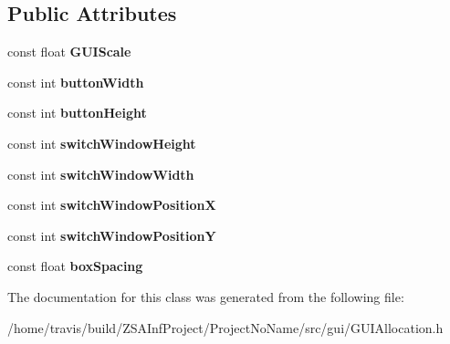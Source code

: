 \subsection*{Public Attributes}
\begin{DoxyCompactItemize}
\item 
\hypertarget{classModeSwitcherAllocation_a8b43cce074611dd34b0e8e4ed9684f5b}{const float {\bfseries G\-U\-I\-Scale}}\label{classModeSwitcherAllocation_a8b43cce074611dd34b0e8e4ed9684f5b}

\item 
\hypertarget{classModeSwitcherAllocation_a1a07c9a15d06237183a0e412f122e4a7}{const int {\bfseries button\-Width}}\label{classModeSwitcherAllocation_a1a07c9a15d06237183a0e412f122e4a7}

\item 
\hypertarget{classModeSwitcherAllocation_a8e44e9460d5877b49d0e63939caf9232}{const int {\bfseries button\-Height}}\label{classModeSwitcherAllocation_a8e44e9460d5877b49d0e63939caf9232}

\item 
\hypertarget{classModeSwitcherAllocation_a170e620e2f3a4ff56d53e65c64cf1444}{const int {\bfseries switch\-Window\-Height}}\label{classModeSwitcherAllocation_a170e620e2f3a4ff56d53e65c64cf1444}

\item 
\hypertarget{classModeSwitcherAllocation_a1eb6b631ea55e263c5eaa46be81d96d1}{const int {\bfseries switch\-Window\-Width}}\label{classModeSwitcherAllocation_a1eb6b631ea55e263c5eaa46be81d96d1}

\item 
\hypertarget{classModeSwitcherAllocation_a4d96a849a50b6f95eef63aa8bab976b1}{const int {\bfseries switch\-Window\-Position\-X}}\label{classModeSwitcherAllocation_a4d96a849a50b6f95eef63aa8bab976b1}

\item 
\hypertarget{classModeSwitcherAllocation_a7eb7df919889a3a63f91cae159e0d0c2}{const int {\bfseries switch\-Window\-Position\-Y}}\label{classModeSwitcherAllocation_a7eb7df919889a3a63f91cae159e0d0c2}

\item 
\hypertarget{classModeSwitcherAllocation_a81dbf7361830c2da9dd27cdc2c59a50d}{const float {\bfseries box\-Spacing}}\label{classModeSwitcherAllocation_a81dbf7361830c2da9dd27cdc2c59a50d}

\end{DoxyCompactItemize}


The documentation for this class was generated from the following file\-:\begin{DoxyCompactItemize}
\item 
/home/travis/build/\-Z\-S\-A\-Inf\-Project/\-Project\-No\-Name/src/gui/G\-U\-I\-Allocation.\-h\end{DoxyCompactItemize}
